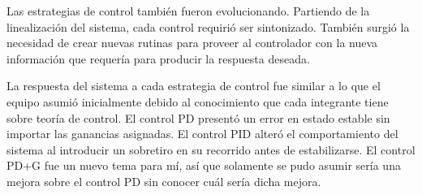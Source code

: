 Las estrategias de control también fueron evolucionando. 
Partiendo de la linealización del sistema, cada control requirió ser sintonizado.
También surgió la necesidad de crear nuevas rutinas para proveer al controlador con la nueva información que requería para producir la respuesta deseada.

La respuesta del sistema a cada estrategia de control fue similar a lo que el equipo asumió inicialmente debido al conocimiento que cada integrante tiene sobre teoría de control.
El control PD presentó un error en estado estable sin importar las ganancias asignadas.
El control PID alteró el comportamiento del sistema al introducir un sobretiro en su recorrido antes de estabilizarse.
El control PD+G fue un nuevo tema para mí, así que solamente se pudo asumir sería una mejora sobre el control PD sin conocer cuál sería dicha mejora.

